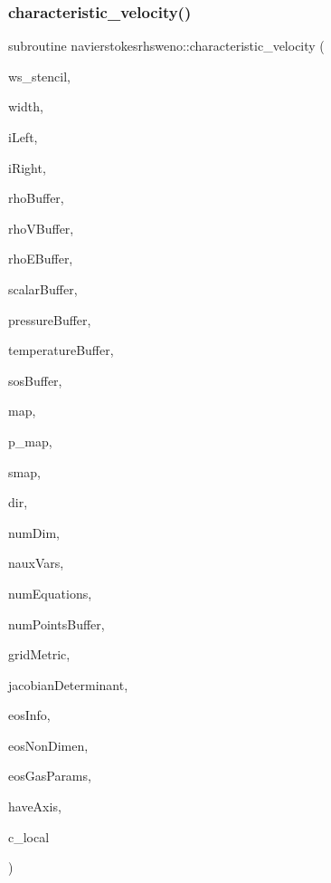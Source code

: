 \subsubsection{\texorpdfstring{characteristic\+\_\+velocity()}{characteristic\_velocity()}}
{\footnotesize\ttfamily subroutine navierstokesrhsweno\+::characteristic\+\_\+velocity (\begin{DoxyParamCaption}\item[{real(kind=8), dimension(\hyperlink{namespacenavierstokesrhsweno_af00ac01da0553acc8e7382cfc4a5ca1b}{width}+1,numequations), intent(out)}]{ws\+\_\+stencil,  }\item[{integer(kind=4)}]{width,  }\item[{integer(kind=4)}]{i\+Left,  }\item[{integer(kind=4)}]{i\+Right,  }\item[{real(kind=8), dimension(numpointsbuffer), intent(in)}]{rho\+Buffer,  }\item[{real(kind=8), dimension(numdim$\ast$numpointsbuffer), intent(in), target}]{rho\+V\+Buffer,  }\item[{real(kind=8), dimension(numpointsbuffer), intent(in)}]{rho\+E\+Buffer,  }\item[{real(kind=8), dimension(nauxvars$\ast$numpointsbuffer), intent(in), target}]{scalar\+Buffer,  }\item[{real(kind=8), dimension(numpointsbuffer), intent(in)}]{pressure\+Buffer,  }\item[{real(kind=8), dimension(numpointsbuffer), intent(in)}]{temperature\+Buffer,  }\item[{real(kind=8), dimension(numpointsbuffer), intent(in)}]{sos\+Buffer,  }\item[{integer(kind=4)}]{map,  }\item[{integer(kind=8), dimension(\+:)}]{p\+\_\+map,  }\item[{real(kind=8), dimension(\+:,\+:)}]{smap,  }\item[{integer(kind=4)}]{dir,  }\item[{integer(kind=4)}]{num\+Dim,  }\item[{integer(kind=4)}]{naux\+Vars,  }\item[{integer(kind=4)}]{num\+Equations,  }\item[{integer(kind=8)}]{num\+Points\+Buffer,  }\item[{real(kind=8), dimension(numdim$\ast$numdim$\ast$numpointsbuffer)}]{grid\+Metric,  }\item[{real(kind=8), dimension(numpointsbuffer)}]{jacobian\+Determinant,  }\item[{integer(kind=8), dimension(numgasinfos)}]{eos\+Info,  }\item[{real(kind=8), dimension(numnondimens), intent(in)}]{eos\+Non\+Dimen,  }\item[{real(kind=8), dimension(numgasparams$\ast$(nauxvars+1)), intent(in)}]{eos\+Gas\+Params,  }\item[{integer(kind=4)}]{have\+Axis,  }\item[{type(\hyperlink{structnavierstokesrhsweno_1_1characteristic__local}{characteristic\+\_\+local})}]{c\+\_\+local }\end{DoxyParamCaption})}




